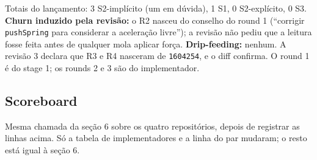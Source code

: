 \documentclass[11pt,a4paper]{article}
\begin{document}
\medskip
Totais do lançamento: 3 S2-implícito (um em dúvida), 1 S1, 0 S2-explícito,
0 S3. \textbf{Churn induzido pela revisão:} o R2 nasceu do conselho do round 1
(``corrigir \texttt{pushSpring} para considerar a aceleração livre''); a
revisão não pediu que a leitura fosse feita antes de qualquer mola aplicar
força. \textbf{Drip-feeding:} nenhum. A revisão 3 declara que R3 e R4 nasceram
de \texttt{1604254}, e o diff confirma. O round 1 é do stage 1; os rounds 2 e
3 são do implementador.

\subsection{Scoreboard}

Mesma chamada da seção 6 sobre os quatro repositórios, depois de registrar
as linhas acima. Só a tabela de implementadores e a linha do par mudaram;
o resto está igual à seção 6.

\medskip
{}

\medskip
{}

\medskip
{}
\end{document}
